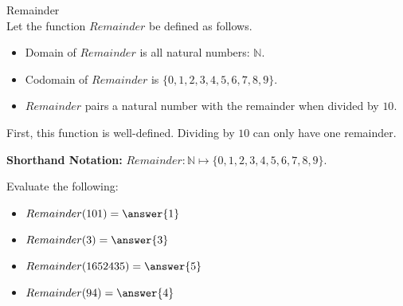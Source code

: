\documentclass{ximera}
\begin{document}
\begin{example} Remainder \\

Let the function $Remainder$ be defined as follows.


\begin{itemize}
\item Domain of $Remainder$ is all natural numbers: $\mathbb{N}$.
\item Codomain of $Remainder$ is $\{ 0, 1, 2, 3, 4, 5, 6, 7, 8, 9 \}$.
\item $Remainder$ pairs a natural number with the remainder when divided by $10$.
\end{itemize}


First, this function is well-defined. Dividing by $10$ can only have one remainder.


\textbf{Shorthand Notation: } $Remainder: \mathbb{N} \mapsto \{ 0, 1, 2, 3, 4, 5, 6, 7, 8, 9 \}$.

\begin{question}
Evaluate the following:

\begin{itemize}
	\item $Remainder(101) = \answer{1}$
	\item $Remainder(3) = \answer{3}$
	\item $Remainder(1652435) = \answer{5}$
	\item $Remainder(94) = \answer{4}$
\end{itemize}

\end{question}



\end{example}
\end{document}
